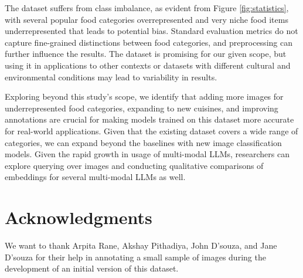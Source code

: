 \documentclass{article}
\begin{document}
The dataset suffers from class imbalance, as evident from Figure \ref{fig:statistics}, with several popular food categories overrepresented and very niche food items underrepresented that leads to potential bias. Standard evaluation metrics do not capture fine-grained distinctions between food categories, and preprocessing can further influence the results. The dataset is promising for our given scope, but using it in applications to other contexts or datasets with different cultural and environmental conditions may lead to variability in results.

Exploring beyond this study's scope, we identify that adding more images for underrepresented food categories, expanding to new cuisines, and improving annotations are crucial for making models trained on this dataset more accurate for real-world applications. Given that the existing dataset covers a wide range of categories, we can expand beyond the baselines with new image classification models. Given the rapid growth in usage of multi-modal LLMs, researchers can explore querying over images and conducting qualitative comparisons of embeddings for several multi-modal LLMs as well.

\section*{Acknowledgments}

We want to thank Arpita Rane, Akshay Pithadiya, John D’souza, and Jane D’souza for their help in annotating a small sample of images during the development of an initial version of this dataset. 



\end{document}
